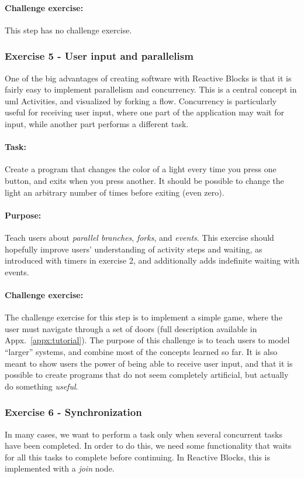 \paragraph{Challenge exercise:} This step has no challenge exercise.

\subsubsection{Exercise 5 - User input and parallelism}
One of the big advantages of creating software with Reactive Blocks is that it is fairly easy to implement parallelism and concurrency. This is a central concept in \gls{uml} Activities, and visualized by forking a flow. Concurrency is particularly useful for receiving user input, where one part of the application may wait for input, while another part performs a different task.

\paragraph{Task:} Create a program that changes the color of a light every time you press one button, and exits when you press another. It should be possible to change the light an arbitrary number of times before exiting (even zero).

\paragraph{Purpose:} Teach users about \emph{parallel branches}, \emph{forks}, and \emph{events}. This exercise should hopefully improve users' understanding of activity steps and waiting, as introduced with timers in exercise 2, and additionally adds indefinite waiting with events.

\paragraph{Challenge exercise:} The challenge exercise for this step is to implement a simple game, where the user must navigate through a set of doors (full description available in Appx.~\ref{appx:tutorial}). The purpose of this challenge is to teach users to model ``larger'' systems, and combine most of the concepts learned so far. It is also meant to show users the power of being able to receive user input, and that it is possible to create programs that do not seem completely artificial, but actually do something \emph{useful}.

\subsubsection{Exercise 6 - Synchronization}
In many cases, we want to perform a task only when several concurrent tasks have been completed. In order to do this, we need some functionality that waits for all this tasks to complete before continuing. In Reactive Blocks, this is implemented with a \emph{join} node.


